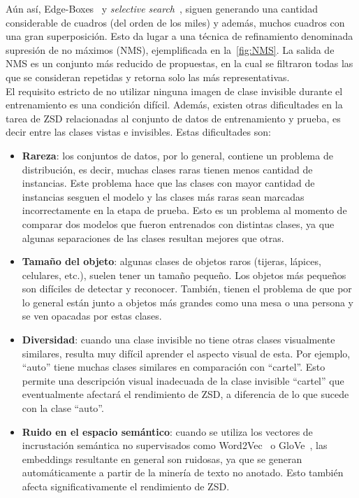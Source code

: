 Aún así, Edge-Boxes~\cite{zitnick2014edge} y \textit{selective search}~\cite{uijlings2013selective}, siguen generando una cantidad considerable de cuadros (del orden de los miles) y además, muchos cuadros con una gran superposición. Esto da lugar a una técnica de refinamiento denominada supresión de no máximos (NMS), ejemplificada en la~\autoref{fig:NMS}. La salida de NMS es un conjunto más reducido de propuestas, en la cual se filtraron todas las que se consideran repetidas y retorna solo las más representativas.\\

El requisito estricto de no utilizar ninguna imagen de clase invisible durante el entrenamiento es una condición difícil. Además, existen otras dificultades en la tarea de ZSD relacionadas al conjunto de datos de entrenamiento y prueba, es decir entre las clases vistas e invisibles. Estas dificultades son:

\begin{itemize}
	\item \textbf{Rareza}: los conjuntos de datos, por lo general, contiene un problema de distribución, es decir, muchas clases raras tienen menos cantidad de instancias. Este problema hace que las clases con mayor cantidad de instancias sesguen el modelo y las clases más raras sean marcadas incorrectamente en la etapa de prueba. Esto es un problema al momento de comparar dos modelos que fueron entrenados con distintas clases, ya que algunas separaciones de las clases resultan mejores que otras.
	
	\item \textbf{Tamaño del objeto}: algunas clases de objetos raros (tijeras, lápices, celulares, etc.), suelen tener un tamaño pequeño. Los objetos más pequeños son difíciles de detectar y reconocer. También, tienen el problema de que por lo general están junto a objetos más grandes como una mesa o una persona y se ven opacadas por estas clases.
	
	\item \textbf{Diversidad}: cuando una clase invisible no tiene otras clases visualmente similares, resulta muy difícil aprender el aspecto visual de esta. Por ejemplo, ``auto'' tiene muchas clases similares en comparación con ``cartel''. Esto permite una descripción visual inadecuada de la clase invisible ``cartel'' que eventualmente afectará el rendimiento de ZSD, a diferencia de lo que sucede con la clase ``auto''.
	
	\item \textbf{Ruido en el espacio semántico}: cuando se utiliza los vectores de incrustación semántica no supervisados como Word2Vec~\cite{mikolov2013distributed} o GloVe~\cite{pennington2014glove}, las embeddings resultante en general son ruidosas, ya que se generan automáticamente a partir de la minería de texto no anotado. Esto también afecta significativamente el rendimiento de ZSD.
\end{itemize}

